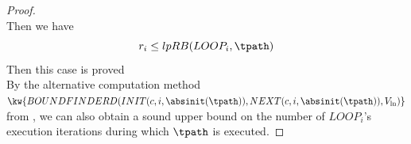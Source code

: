 \begin{proof}
        \\
        Then we have
        \[ 
          r_i \leq lpRB(LOOP_i, \tpath) 
          \]
        Then this case is proved
        \\
        By the alternative computation method 
        $\kw{BOUNDFINDERD(INIT(c, i, \absinit(\tpath)), NEXT(c, i, \absinit(\tpath)), V_{\ln})}$ from \cite{GulwaniJK09},
        we can also obtain a sound upper bound on
        the number of $LOOP_i$'s execution iterations
        during which $\tpath$ is executed. 
  \end{proof}


